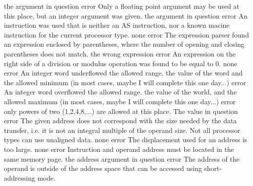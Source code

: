 \documentclass[12pt,twoside]{report}
\begin{document}
\begin{description}
               {the argument in question}
               {error}
               {Only a floating point argument may be used at this place,
                but an integer argument was given.}
               {the argument in question}
               {error}
               {An instruction was used that is neither an AS instruction, nor a
                known macine instruction for the current processor type.}
               {none}
               {error}
               {The expression parser found an expression enclosed by
                parentheses, where the number of opening and closing
                parentheses does not match.}
               {the wrong expression}
               {error}
               {An expression on the right side of a division or modulus
                operation was found to be equal to 0.}
               {none}
               {error}
               {An integer word underflowed the allowed range.}
               {the value of the word and the allowed minimum (in most
                cases, maybe I will complete this one day...)}
               {error}
               {An integer word overflowed the allowed range.}
               {the value of the world, and the allowed maximum (in most
                cases, maybe I will complete this one day...)}
               {error}
               {only powers of two (1,2,4,8,...) are allowed at this place.}
               {The value in question}
               {error}
               {The given address does not correspond with the size needed
                by the data transfer, i.e. it is not an integral multiple of
                the operand size. Not all processor types can use unaligned
                data.}
               {none}
               {error}
               {The displacement used for an address is too large.}
               {none}
               {error}
               {Instruction and operand address must be located in the
                same memory page.}
               {the address argument in question}
               {error}
               {The address of the operand is outside of the address space
                that can be accessed using short-addressing mode.}

\end{description}
\end{document}
